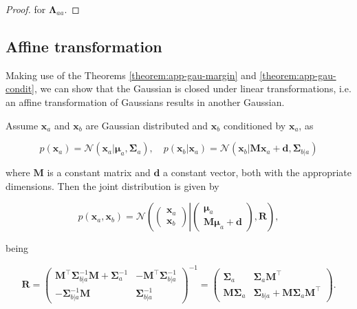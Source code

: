 \begin{appendices}
\begin{proof}
    for $\boldsymbol{\Lambda}_{aa}$.
  \end{proof}

  \subsection{Affine transformation}
  \label{subsec:app-affine-transf-gau}
  
  Making use of the Theorems \ref{theorem:app-gau-margin} and \ref{theorem:app-gau-condit}, we can show that the Gaussian is closed under linear transformations, i.e. an affine transformation of Gaussians results in another Gaussian.
  
  \begin{theorem}
    
    Assume $\mathbf{x}_a$ and $\mathbf{x}_b$ are Gaussian distributed and $\mathbf{x}_b$ conditioned by $\mathbf{x}_a$, as

    \begin{equation}
    p\left(\mathbf{x}_{a}\right) =\mathcal{N}\left(\mathbf{x}_{a} | \boldsymbol{\mu}_{a}, \boldsymbol{\Sigma}_{a}\right), \quad p\left(\mathbf{x}_{b} | \mathbf{x}_{a}\right) =\mathcal{N}\left(\mathbf{x}_{b} | \mathbf{M} \mathbf{x}_{a}+\mathbf{d}, \boldsymbol{\Sigma}_{b | a}\right)
    \end{equation}

    where $\mathbf{M}$ is a constant matrix and $\mathbf{d}$ a constant vector, both with the appropriate dimensions. Then the joint distribution is given by

    \begin{equation}
    p\left(\mathbf{x}_{a}, \mathbf{x}_{b}\right)=\mathcal{N}\left(\left(\begin{array}{c}{\mathbf{x}_{a}} \\ {\mathbf{x}_{b}}\end{array}\right) \left|\left(\begin{array}{c}{\boldsymbol{\mu}_{a}} \\ {\mathbf{M} \boldsymbol{\mu}_{a}+\mathbf{d}}\end{array}\right.\right), \mathbf{R}\right),
    \end{equation}

    being

    \begin{equation}
    \mathbf{R}=\left(\begin{array}{cc}{\mathbf{M}^\top \boldsymbol{\Sigma}_{b | a}^{-1} \mathbf{M}+\boldsymbol{\Sigma}_{a}^{-1}} & {-\mathbf{M}^\top \boldsymbol{\Sigma}_{b | a}^{-1}} \\ {-\boldsymbol{\Sigma}_{b | a}^{-1} \mathbf{M}} & {\boldsymbol{\Sigma}_{b | a}^{-1}}\end{array}\right)^{-1}=\left(\begin{array}{cc}{\boldsymbol{\Sigma}_{a}} & {\boldsymbol{\Sigma}_{a} \mathbf{M}^\top} \\ {\mathbf{M} \boldsymbol{\Sigma}_{a}} & {\boldsymbol{\Sigma}_{b | a}+\mathbf{M} \boldsymbol{\Sigma}_{a} \mathbf{M}^\top}\end{array}\right).
    \end{equation}
    

\end{theorem}
\end{appendices}
